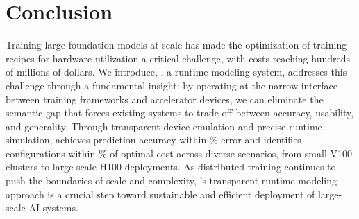 \section{Conclusion}
\label{sec:conclusion}
Training large foundation models at scale has made the optimization of training recipes for hardware utilization a critical challenge, with costs reaching hundreds of millions of dollars. We introduce, \sysname, a runtime modeling system, addresses this challenge through a fundamental insight: by operating at the narrow interface between training frameworks and accelerator devices, we can eliminate the semantic gap that forces existing systems to trade off between accuracy, usability, and generality. Through transparent device emulation and precise runtime simulation, \sysname achieves prediction accuracy within \evalpe\% error and identifies configurations within \evalcg\% of optimal cost across diverse scenarios, from small V100 clusters to large-scale H100 deployments. As distributed training continues to push the boundaries of scale and complexity, \sysname's transparent runtime modeling approach is a crucial step toward sustainable and efficient deployment of large-scale AI systems.


